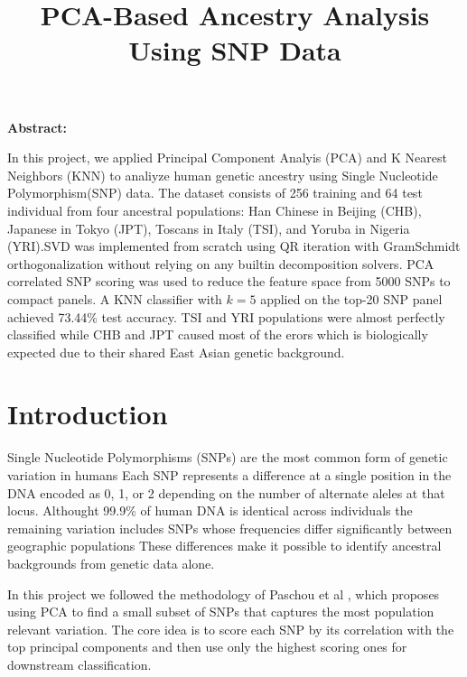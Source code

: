 \documentclass[conference]{IEEEtran}
\renewenvironment{abstract}{%
  \normalfont\small\noindent\textbf{Abstract: }\itshape\ignorespaces%
}{%
  \normalfont\par%
}
\begin{document}
\title{PCA-Based Ancestry Analysis Using SNP Data}

\author{
}

\maketitle

\begin{abstract}
In this project, we applied Principal Component Analyis (PCA) and K Nearest Neighbors (KNN) to analiyze human genetic ancestry using Single Nucleotide Polymorphism(SNP) data. The dataset consists of 256 training and 64 test individual from four ancestral populations: Han Chinese in Beijing (CHB), Japanese in Tokyo (JPT), Toscans in Italy (TSI), and Yoruba in Nigeria (YRI).SVD was implemented from scratch using QR iteration with GramSchmidt orthogonalization without relying on any builtin decomposition solvers. PCA correlated SNP scoring was used to reduce the feature space from 5000 SNPs to compact panels. A KNN classifier with $k{=}5$ applied on the top-20 SNP panel achieved 73.44\% test accuracy. TSI and YRI populations were almost perfectly classified while CHB and JPT caused most of the erors which is biologically expected due to their shared East Asian genetic background.
\end{abstract}

\section{Introduction}

Single Nucleotide Polymorphisms (SNPs) are the most common form of genetic variation in humans Each SNP represents a difference at a single position in the DNA encoded as 0, 1, or 2 depending on the number of alternate aleles at that locus. Althought 99.9\% of human DNA is identical across individuals the remaining variation includes SNPs whose frequencies differ significantly between geographic populations These differences make it possible to identify ancestral backgrounds from genetic data alone.

In this project we followed the methodology of Paschou et al \cite{paschou2007}, which proposes using PCA to find a small subset of SNPs that captures the most population relevant variation. The core idea is to score each SNP by its correlation with the top principal components and then use only the highest scoring ones for downstream classification.
\end{document}
